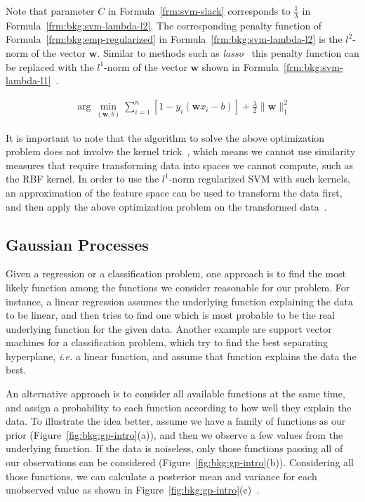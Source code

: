 Note that parameter $C$ in Formula~\ref{frm:svm-slack} corresponds to $\frac{1}{\lambda}$ in Formula~\ref{frm:bkg:svm-lambda-l2}. The corresponding penalty function of Formula~\ref{frm:bkg:emp-regularized} in Formula~\ref{frm:bkg:svm-lambda-l2} is the $l^2$-norm of the vector $\mathbf{w}$. Similar to methods such as \emph{lasso}~\cite[Ch. 3]{statistical-learning} this penalty function can be replaced with the $l^1$-norm of the vector $\mathbf{w}$ shown in Formula~\ref{frm:bkg:svm-lambda-l1}~\cite{zhu20041}.

\begin{align}
  \arg\min_{(\mathbf{w},b)}\sum_{i=1}^{n}[1-y_i(\mathbf{w}x_i - b)] + \frac{\lambda}{2}\|\mathbf{w}\|_1^2
  \label{frm:bkg:svm-lambda-l1}
\end{align}

It is important to note that the algorithm to solve the above optimization problem does not involve the kernel trick~\cite{zhu20041}, which means we cannot use similarity measures that require transforming data into spaces we cannot compute, such as the RBF kernel. In order to use the $l^1$-norm regularized SVM with such kernels, an approximation of the feature space can be used to transform the data first, and then apply the above optimization problem on the transformed data~\cite{rahimi2007random}.

\subsection{Gaussian Processes}
Given a regression or a classification problem, one approach is to find the most likely function among the functions we consider reasonable for our problem. For instance, a linear regression assumes the underlying function explaining the data to be linear, and then tries to find one which is most probable to be the real underlying function for the given data. Another example are support vector machines for a classification problem, which try to find the best separating hyperplane, \emph{i.e.} a linear function, and assume that function explains the data the best.

An alternative approach is to consider all available functions at the same time, and assign a probability to each function according to how well they explain the data. To illustrate the idea better, assume we have a family of functions as our prior (Figure~\ref{fig:bkg:gp-intro}(a)), and then we observe a few values from the underlying function. If the data is noiseless, only those functions passing all of our observations can be considered (Figure~\ref{fig:bkg:gp-intro}(b)). Considering all those functions, we can calculate a posterior mean and variance for each unobserved value as shown in Figure~\ref{fig:bkg:gp-intro}(c)~\cite{gaussian-processes}.


